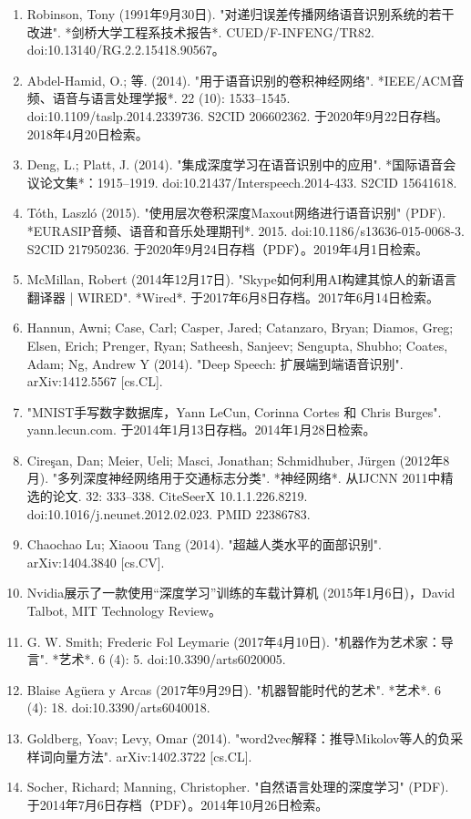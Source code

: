 \begin{enumerate}
\item Robinson, Tony (1991年9月30日). "对递归误差传播网络语音识别系统的若干改进". *剑桥大学工程系技术报告*. CUED/F-INFENG/TR82. doi:10.13140/RG.2.2.15418.90567。
\item Abdel-Hamid, O.; 等. (2014). "用于语音识别的卷积神经网络". *IEEE/ACM音频、语音与语言处理学报*. 22 (10): 1533–1545. doi:10.1109/taslp.2014.2339736. S2CID 206602362. 于2020年9月22日存档。2018年4月20日检索。
\item Deng, L.; Platt, J. (2014). "集成深度学习在语音识别中的应用". *国际语音会议论文集*：1915–1919. doi:10.21437/Interspeech.2014-433. S2CID 15641618.
\item Tóth, Laszló (2015). "使用层次卷积深度Maxout网络进行语音识别" (PDF). *EURASIP音频、语音和音乐处理期刊*. 2015. doi:10.1186/s13636-015-0068-3. S2CID 217950236. 于2020年9月24日存档（PDF）。2019年4月1日检索。
\item McMillan, Robert (2014年12月17日). "Skype如何利用AI构建其惊人的新语言翻译器 | WIRED". *Wired*. 于2017年6月8日存档。2017年6月14日检索。
\item Hannun, Awni; Case, Carl; Casper, Jared; Catanzaro, Bryan; Diamos, Greg; Elsen, Erich; Prenger, Ryan; Satheesh, Sanjeev; Sengupta, Shubho; Coates, Adam; Ng, Andrew Y (2014). "Deep Speech: 扩展端到端语音识别". arXiv:1412.5567 [cs.CL].
\item "MNIST手写数字数据库，Yann LeCun, Corinna Cortes 和 Chris Burges". yann.lecun.com. 于2014年1月13日存档。2014年1月28日检索。
\item Cireşan, Dan; Meier, Ueli; Masci, Jonathan; Schmidhuber, Jürgen (2012年8月). "多列深度神经网络用于交通标志分类". *神经网络*. 从IJCNN 2011中精选的论文. 32: 333–338. CiteSeerX 10.1.1.226.8219. doi:10.1016/j.neunet.2012.02.023. PMID 22386783.
\item Chaochao Lu; Xiaoou Tang (2014). "超越人类水平的面部识别". arXiv:1404.3840 [cs.CV].
\item Nvidia展示了一款使用“深度学习”训练的车载计算机 (2015年1月6日)，David Talbot, MIT Technology Review。
\item G. W. Smith; Frederic Fol Leymarie (2017年4月10日). "机器作为艺术家：导言". *艺术*. 6 (4): 5. doi:10.3390/arts6020005.
\item Blaise Agüera y Arcas (2017年9月29日). "机器智能时代的艺术". *艺术*. 6 (4): 18. doi:10.3390/arts6040018.
\item Goldberg, Yoav; Levy, Omar (2014). "word2vec解释：推导Mikolov等人的负采样词向量方法". arXiv:1402.3722 [cs.CL].
\item Socher, Richard; Manning, Christopher. "自然语言处理的深度学习" (PDF). 于2014年7月6日存档（PDF）。2014年10月26日检索。

\end{enumerate}
